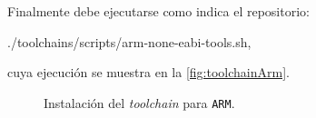 	\newpage
	
	Finalmente debe ejecutarse como indica el repositorio:
	\begin{center}
		\ttfamily
		./toolchains/scripts/arm-none-eabi-tools.sh,
	\end{center}
	cuya ejecución se muestra en la \autoref{fig:toolchainArm}.
	\begin{figure}[ht]
		\centering
		\vspace{0.5cm}
		\caption{
			Instalación del \textit{toolchain} para \texttt{ARM}.
			\label{fig:toolchainArm}
		}
	\end{figure}
	

